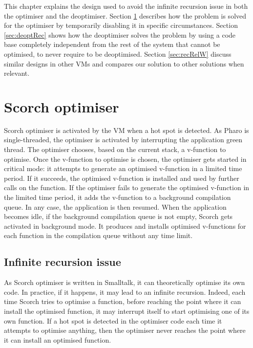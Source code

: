 \documentclass[a4paper,12pt,twoside]{../includes/ThesisStyle}
\begin{document}
This chapter explains the design used to avoid the infinite recursion issue in both the optimiser and the deoptimiser. Section \ref{sec:optRec} describes how the problem is solved for the optimiser by temporarily disabling it in specific circumstances. Section \ref{sec:deoptRec} shows how the deoptimiser solves the problem by using a code base completely independent from the rest of the system that cannot be optimised, to never require to be deoptimised. Section \ref{sec:recRelW} discuss similar designs in other VMs and compares our solution to other solutions when relevant.


\section{Scorch optimiser}
\label{sec:optRec}

Scorch optimiser is activated by the VM when a hot spot is detected. As Pharo is single-threaded, the optimiser is activated by interrupting the application green thread. The optimiser chooses, based on the current stack, a v-function to optimise.  Once the v-function to optimise is chosen, the optimiser gets started in critical mode: it attempts to generate an optimised v-function in a limited time period. If it succeeds, the optimised v-function is installed and used by further calls on the function. If the optimiser fails to generate the optimised v-function in the limited time period, it adds the v-function to a background compilation queue. In any case, the application is then resumed. When the application becomes idle, if the background compilation queue is not empty, Scorch gets activated in background mode. It produces and installs optimised v-functions for each function in the compilation queue without any time limit. 

\subsection{Infinite recursion issue}

As Scorch optimiser is written in Smalltalk, it can theoretically optimise its own code. In practice, if it happens, it may lead to an infinite recursion. Indeed, each time Scorch tries to optimise a function, before reaching the point where it can install the optimised function, it may interrupt itself to start optimising one of its own function. If a hot spot is detected in the optimiser code each time it attempts to optimise anything, then the optimiser never reaches the point where it can install an optimised function.
\end{document}
